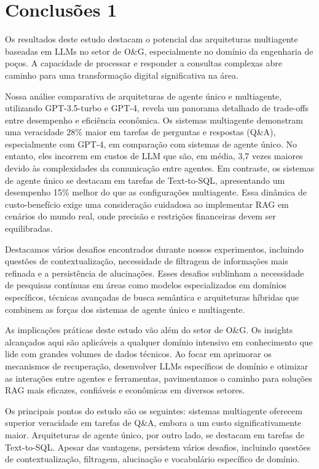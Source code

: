 

\chapter{Conclusões 1}

    Os resultados deste estudo destacam o potencial das arquiteturas multiagente baseadas em LLMs no setor de O\&G, especialmente no domínio da engenharia de poços. A capacidade de processar e responder a consultas complexas abre caminho para uma transformação digital significativa na área.
    
    Nossa análise comparativa de arquiteturas de agente único e multiagente, utilizando GPT-3.5-turbo e GPT-4, revela um panorama detalhado de trade-offs entre desempenho e eficiência econômica. Os sistemas multiagente demonstram uma veracidade 28\% maior em tarefas de perguntas e respostas (Q\&A), especialmente com GPT-4, em comparação com sistemas de agente único. No entanto, eles incorrem em custos de LLM que são, em média, 3,7 vezes maiores devido às complexidades da comunicação entre agentes. Em contraste, os sistemas de agente único se destacam em tarefas de Text-to-SQL, apresentando um desempenho 15\% melhor do que as configurações multiagente. Essa dinâmica de custo-benefício exige uma consideração cuidadosa ao implementar RAG em cenários do mundo real, onde precisão e restrições financeiras devem ser equilibradas.
    
    Destacamos vários desafios encontrados durante nossos experimentos, incluindo questões de contextualização, necessidade de filtragem de informações mais refinada e a persistência de alucinações. Esses desafios sublinham a necessidade de pesquisas contínuas em áreas como modelos especializados em domínios específicos, técnicas avançadas de busca semântica e arquiteturas híbridas que combinem as forças dos sistemas de agente único e multiagente.
    
    As implicações práticas deste estudo vão além do setor de O\&G. Os insights alcançados aqui são aplicáveis a qualquer domínio intensivo em conhecimento que lide com grandes volumes de dados técnicos. Ao focar em aprimorar os mecanismos de recuperação, desenvolver LLMs específicos de domínio e otimizar as interações entre agentes e ferramentas, pavimentamos o caminho para soluções RAG mais eficazes, confiáveis e econômicas em diversos setores.
    
    Os principais pontos do estudo são os seguintes: sistemas multiagente oferecem superior veracidade em tarefas de Q\&A, embora a um custo significativamente maior. Arquiteturas de agente único, por outro lado, se destacam em tarefas de Text-to-SQL. Apesar das vantagens, persistem vários desafios, incluindo questões de contextualização, filtragem, alucinação e vocabulário específico de domínio.
    
